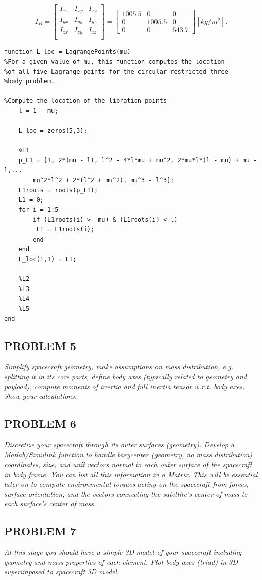 \begin{equation}
I_{B} =
\begin{bmatrix} 
I_{xx} & I_{xy} & I_{xz} \\
I_{yx} & I_{yy} & I_{yz} \\ 
I_{zx} & I_{zy} & I_{zz} \\
\end{bmatrix}
=
\begin{bmatrix}
1005.5 & 0 & 0 \\
0 & 1005.5 & 0 \\ 
0 & 0 & 543.7
\end{bmatrix}
[kg/m^2].
\end{equation}

\begin{lstlisting}
function L_loc = LagrangePoints(mu)
%For a given value of mu, this function computes the location
%of all five Lagrange points for the circular restricted three
%body problem.

%Compute the location of the libration points
    l = 1 - mu;

    L_loc = zeros(5,3);

    %L1
    p_L1 = [1, 2*(mu - l), l^2 - 4*l*mu + mu^2, 2*mu*l*(l - mu) + mu - l,...
        mu^2*l^2 + 2*(l^2 + mu^2), mu^3 - l^3];
    L1roots = roots(p_L1);
    L1 = 0;
    for i = 1:5
        if (L1roots(i) > -mu) & (L1roots(i) < l)
         L1 = L1roots(i);
        end
    end
    L_loc(1,1) = L1;

    %L2
    %L3
    %L4
    %L5
end
\end{lstlisting}

\subsection{PROBLEM 5}
\textit{Simplify spacecraft geometry, make assumptions on mass distribution, e.g. splitting it in its core parts, define body axes (typically related to geometry and payload), compute moments of inertia and full inertia tensor w.r.t. body axes. Show your calculations.}



\subsection{PROBLEM 6}
\textit{Discretize your spacecraft through its outer surfaces (geometry). Develop a Matlab/Simulink function to handle barycenter (geometry, no mass distribution) coordinates, size, and unit vectors normal to each outer surface of the spacecraft in body frame. You can list all this information in a Matrix. This will be essential later on to compute environmental torques acting on the spacecraft from forces, surface orientation, and the vectors connecting the satellite’s center of mass to each surface’s center of mass.}



\subsection{PROBLEM 7}
\textit{At this stage you should have a simple 3D model of your spacecraft including geometry and mass properties of each element. Plot body axes (triad) in 3D superimposed to spacecraft 3D model.}
